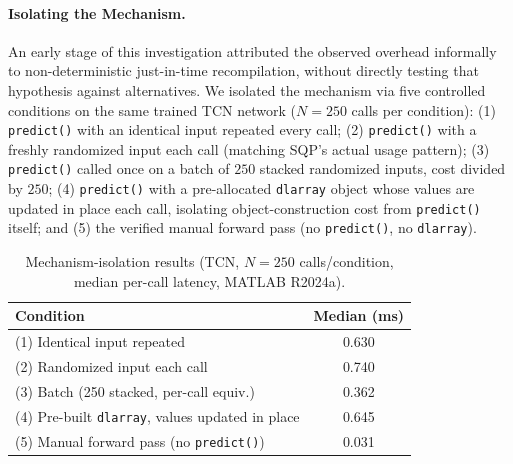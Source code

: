 \paragraph{Isolating the Mechanism.} An early stage of this
investigation attributed the observed overhead informally to
non-deterministic just-in-time recompilation, without directly testing
that hypothesis against alternatives. We isolated the mechanism via
five controlled conditions on the same trained TCN network ($N=250$
calls per condition): (1) \texttt{predict()} with an identical input
repeated every call; (2) \texttt{predict()} with a freshly randomized
input each call (matching SQP's actual usage pattern); (3)
\texttt{predict()} called once on a batch of $250$ stacked randomized
inputs, cost divided by $250$; (4) \texttt{predict()} with a
pre-allocated \texttt{dlarray} object whose values are updated in
place each call, isolating object-construction cost from
\texttt{predict()} itself; and (5) the verified manual forward pass
(no \texttt{predict()}, no \texttt{dlarray}).

\begin{table}[H]
\centering
\caption{Mechanism-isolation results (TCN, $N=250$ calls/condition,
median per-call latency, MATLAB R2024a).}
\label{tab:mechanism_isolation}
\begin{tabular}{lc}
\toprule
Condition & Median (ms) \\
\midrule
(1) Identical input repeated & 0.630 \\
(2) Randomized input each call & 0.740 \\
(3) Batch (250 stacked, per-call equiv.) & 0.362 \\
(4) Pre-built \texttt{dlarray}, values updated in place & 0.645 \\
(5) Manual forward pass (no \texttt{predict()}) & 0.031 \\
\bottomrule
\end{tabular}
\end{table}

